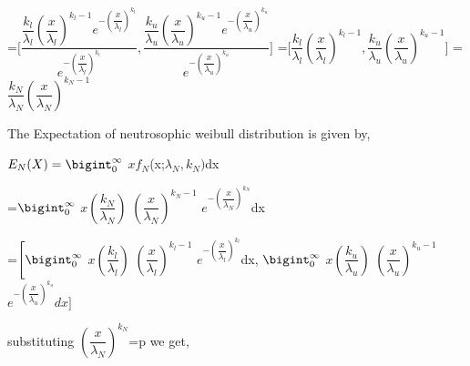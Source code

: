 \documentclass[12pt,a4paper,oneside]{article}
\begin{document}
\hspace*{5cm}=$\Biggl[\dfrac{\dfrac{k_{l}}{\lambda_{l}}\left(\dfrac{x}{\lambda_{l}}\right)^{k_{l}-1}e^{-\left(\dfrac{x}{\lambda_{l}}\right)^{k_{l}}}}{e^{-\left(\dfrac{x}{\lambda_{l}}\right)^{k_{l}}}},\dfrac{\dfrac{k_{u}}{\lambda_{u}}\left(\dfrac{x}{\lambda_{u}}\right)^{k_{u}-1}e^{-\left(\dfrac{x}{\lambda_{u}}\right)^{k_{u}}}}{e^{-\left(\dfrac{x}{\lambda_{u}}\right)^{k_{u}}}}\Biggr]$\newline\newline\newline
\hspace*{5cm}=$\Biggl[\dfrac{k_{l}}{\lambda_{l}}\left(\dfrac{x}{\lambda_{l}}\right)^{k_{l}-1},\dfrac{k_{u}}{\lambda_{u}}\left(\dfrac{x}{\lambda_{u}}\right)^{k_{u}-1}\Biggr]$\newline\newline
\hspace*{5cm}=$\boxed{\dfrac{k_{N}}{\lambda_{N}}\left(\dfrac{x}{\lambda_{N}}\right)^{k_{N}-1}}$
\begin{singlespace}
\vspace*{2cm} The Expectation of neutrosophic weibull distribution is given by,
\end{singlespace}
\begin{center}
\hspace{5cm}$E_{N}(X)=\bigint_{0}^{\infty}$ $xf_{N}$(x;${\lambda_{N}},k_{N})$dx\newline\newline
\begin{singlespace}
\hspace{5.5cm}=$\bigint_{0}^{\infty}$ $x\left(\dfrac{k_{N}}{{\lambda_{N}}}\right)$ $\left(\dfrac{x}{\lambda_{N}}\right)^{k_{N}-1}$ $e^{-\left(\dfrac{x}{\lambda_{N}}\right)^{k_{N}}}$dx
\end{singlespace}\vspace*{1cm}
\hspace{1cm}=$\Biggl[\bigint_{0}^{\infty}$ $x\left(\dfrac{k_{l}}{{\lambda_{l}}}\right)$ $\left(\dfrac{x}{\lambda_{l}}\right)^{k_{l}-1}$ $e^{-\left(\dfrac{x}{\lambda_{l}}\right)^{k_{l}}}$dx\hspace{2mm},\hspace{2mm} $\bigint_{0}^{\infty}$ $x\left(\dfrac{k_{u}}{{\lambda_{u}}}\right)$ $\left(\dfrac{x}{\lambda_{u}}\right)^{k_{u}-1}$ $e^{-\left(\dfrac{x}{\lambda_{u}}\right)^{k_{u}}}dx\Biggr]$
\end{center}
substituting $\left(\dfrac{x}{{\lambda_{N}}}\right)^{k_{N}}$=p we get,\\
\newline
\end{document}
